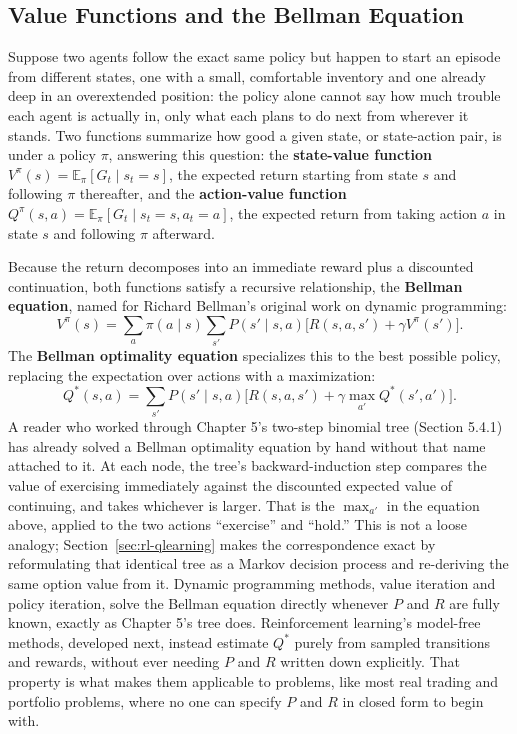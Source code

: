 \documentclass[../ai_in_finance]{subfiles}
\begin{document}
\subsection{Value Functions and the Bellman Equation}
\label{sec:bellman}

Suppose two agents follow the exact same policy but happen to start an episode from different states, one with a small, comfortable inventory and one already deep in an overextended position: the policy alone cannot say how much trouble each agent is actually in, only what each plans to do next from wherever it stands. Two functions summarize how good a given state, or state-action pair, is under a policy $\pi$, answering this question: the \textbf{state-value function} $V^\pi(s) = \mathbb{E}_\pi[G_t \mid s_t = s]$, the expected return starting from state $s$ and following $\pi$ thereafter, and the \textbf{action-value function} $Q^\pi(s,a) = \mathbb{E}_\pi[G_t \mid s_t = s, a_t = a]$, the expected return from taking action $a$ in state $s$ and following $\pi$ afterward.

Because the return decomposes into an immediate reward plus a discounted continuation, both functions satisfy a recursive relationship, the \textbf{Bellman equation}, named for Richard Bellman's original work on dynamic programming:
\begin{equation*}
V^\pi(s) = \sum_a \pi(a \mid s) \sum_{s'} P(s' \mid s, a)\Big[R(s,a,s') + \gamma V^\pi(s')\Big].
\end{equation*}
The \textbf{Bellman optimality equation} specializes this to the best possible policy, replacing the expectation over actions with a maximization:
\begin{equation*}
Q^*(s,a) = \sum_{s'} P(s' \mid s, a)\Big[R(s,a,s') + \gamma \max_{a'} Q^*(s',a')\Big].
\end{equation*}
A reader who worked through Chapter 5's two-step binomial tree (Section 5.4.1) has already solved a Bellman optimality equation by hand without that name attached to it. At each node, the tree's backward-induction step compares the value of exercising immediately against the discounted expected value of continuing, and takes whichever is larger. That is the $\max_{a'}$ in the equation above, applied to the two actions ``exercise'' and ``hold.'' This is not a loose analogy; Section~\ref{sec:rl-qlearning} makes the correspondence exact by reformulating that identical tree as a Markov decision process and re-deriving the same option value from it. Dynamic programming methods, value iteration and policy iteration, solve the Bellman equation directly whenever $P$ and $R$ are fully known, exactly as Chapter 5's tree does. Reinforcement learning's model-free methods, developed next, instead estimate $Q^*$ purely from sampled transitions and rewards, without ever needing $P$ and $R$ written down explicitly. That property is what makes them applicable to problems, like most real trading and portfolio problems, where no one can specify $P$ and $R$ in closed form to begin with.
\end{document}
